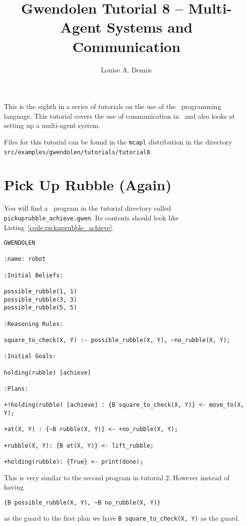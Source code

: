 \documentclass[a4]{article}
\author{Louise A. Dennis}
\title{Gwendolen Tutorial 8 -- Multi-Agent Systems and Communication}
\begin{document}
\maketitle
This is the eighth in a series of tutorials on the use of the \gwendolen\ programming language.  This tutorial covers the use of communication in \gwendolen\ and also looks at setting up a multi-agent system.

Files for this tutorial can be found in the \texttt{mcapl} distribution in the directory \texttt{src/examples/gwendolen/tutorials/tutorial8}.

\section{Pick Up Rubble (Again)}

You will find a \gwendolen\ program in the tutorial directory called \texttt{pickuprubble\_achieve.gwen}.  Its contents should look like Listing~\ref{code:pickuprubble_achieve}.
\begin{lstlisting}[float,caption=Pick Up Rubble (Reasoning Rules),basicstyle=\sffamily,style=easslisting,language=Gwendolen,label=code:pickuprubble_achieve]
GWENDOLEN

:name: robot

:Initial Beliefs:

possible_rubble(1, 1)
possible_rubble(3, 3)
possible_rubble(5, 5)

:Reasoning Rules:

square_to_check(X, Y) :- possible_rubble(X, Y), ~no_rubble(X, Y);

:Initial Goals:

holding(rubble) [achieve]

:Plans:

+!holding(rubble) [achieve] : {B square_to_check(X, Y)} <- move_to(X, Y);

+at(X, Y) : {~B rubble(X, Y)} <- +no_rubble(X, Y);

+rubble(X, Y): {B at(X, Y)} <- lift_rubble;

+holding(rubble): {True} <- print(done);
\end{lstlisting}

This is very similar to the second program in tutorial 2.  However instead of having 
\begin{verbatim}
{B possible_rubble(X, Y), ~B no_rubble(X, Y)}
\end{verbatim}as the guard to the first plan we have \lstinline{B square_to_check(X, Y)} as the guard.
\end{document}
